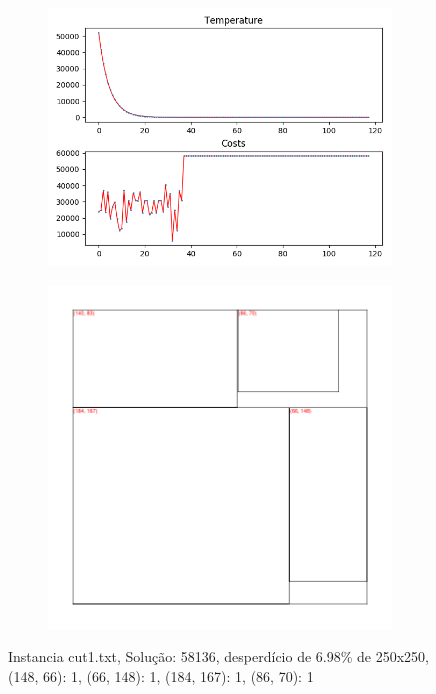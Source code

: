 \begin{figure}
\centering
\begin{subfigure}{.5\textwidth}
  \centering
  \includegraphics[width=1\linewidth]{results/cut1/1/plot}
  \label{fig:sub1}
\end{subfigure}%
\begin{subfigure}{.5\textwidth}
  \centering
  \includegraphics[width=1\linewidth]{results/cut1/1/cut}
  \label{fig:sub2}
\end{subfigure}
\caption{Instancia cut1.txt, Solução: 58136, desperdício de 6.98\% de 250x250, {(148, 66): 1, (66, 148): 1, (184, 167): 1, (86, 70): 1}}
\label{fig:test}
\end{figure}



